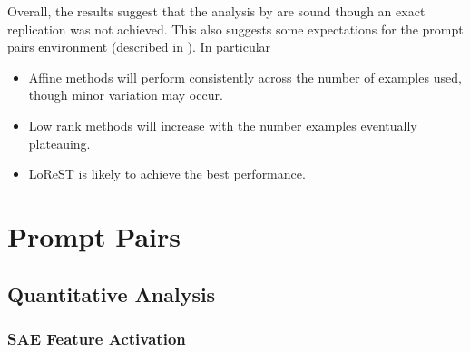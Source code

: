 Overall, the results suggest that the analysis by \citet{steering-clear} are sound though an exact replication was not achieved.
This also suggests some expectations for the prompt pairs environment (described in ).
In particular
\begin{itemize}[nolistsep]
    \item Affine methods will perform consistently across the number of examples used, though minor variation may occur.
    \item Low rank methods will increase with the number examples eventually plateauing.
    \item LoReST is likely to achieve the best performance.
\end{itemize}

\section{Prompt Pairs}
\label{sec:prompt-pairs-res}

\subsection{Quantitative Analysis}

\subsubsection{SAE Feature Activation}

